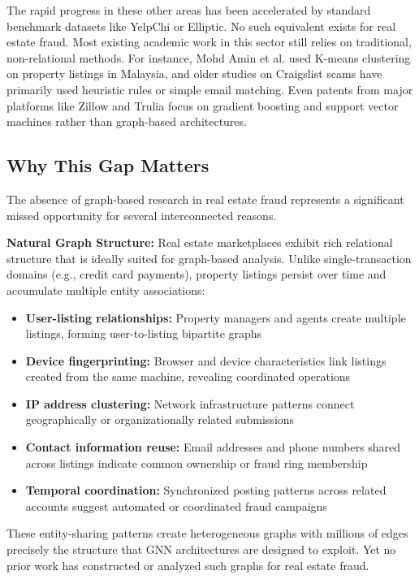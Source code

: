 The rapid progress in these other areas has been accelerated by standard benchmark datasets like YelpChi or Elliptic. No such equivalent exists for real estate fraud. Most existing academic work in this sector still relies on traditional, non-relational methods. For instance, Mohd Amin et al. \cite{mohdamin2024clustering} used K-means clustering on property listings in Malaysia, and older studies on Craigslist scams have primarily used heuristic rules or simple email matching. Even patents from major platforms like Zillow and Trulia focus on gradient boosting and support vector machines rather than graph-based architectures.

\subsection{Why This Gap Matters}

The absence of graph-based research in real estate fraud represents a significant missed opportunity for several interconnected reasons.

\textbf{Natural Graph Structure:} Real estate marketplaces exhibit rich relational structure that is ideally suited for graph-based analysis. Unlike single-transaction domains (e.g., credit card payments), property listings persist over time and accumulate multiple entity associations:

\begin{itemize}
    \item \textbf{User-listing relationships:} Property managers and agents create multiple listings, forming user-to-listing bipartite graphs
    \item \textbf{Device fingerprinting:} Browser and device characteristics link listings created from the same machine, revealing coordinated operations
    \item \textbf{IP address clustering:} Network infrastructure patterns connect geographically or organizationally related submissions
    \item \textbf{Contact information reuse:} Email addresses and phone numbers shared across listings indicate common ownership or fraud ring membership
    \item \textbf{Temporal coordination:} Synchronized posting patterns across related accounts suggest automated or coordinated fraud campaigns
\end{itemize}

These entity-sharing patterns create heterogeneous graphs with millions of edges precisely the structure that GNN architectures are designed to exploit. Yet no prior work has constructed or analyzed such graphs for real estate fraud.

